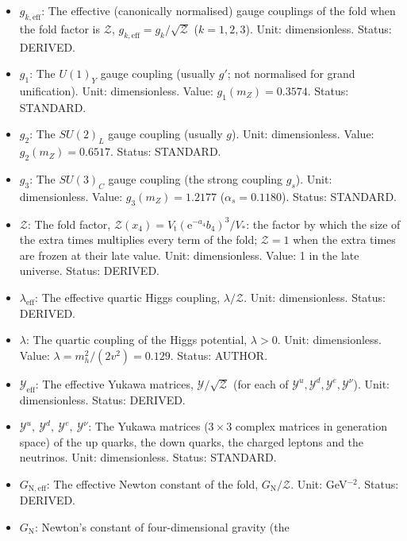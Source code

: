 \documentclass[
  10pt,
]{article}
\providecommand{\tightlist}{%
  \setlength{\itemsep}{0pt}\setlength{\parskip}{0pt}}
\begin{document}
\begin{itemize}
\tightlist
\item
  \(g_{k,\mathrm{eff}}\): The effective (canonically normalised) gauge
  couplings of the fold when the fold factor is \(\mathcal{Z}\),
  \(g_{k,\mathrm{eff}} = g_k/\sqrt{\mathcal{Z}}\) (\(k = 1, 2, 3\)).
  Unit: dimensionless. Status: DERIVED.
\item
  \(g_1\): The \(U(1)_Y\) gauge coupling (usually \(g'\); not normalised
  for grand unification). Unit: dimensionless. Value:
  \(g_1(m_Z) = 0.3574\). Status: STANDARD.
\item
  \(g_2\): The \(SU(2)_L\) gauge coupling (usually \(g\)). Unit:
  dimensionless. Value: \(g_2(m_Z) = 0.6517\). Status: STANDARD.
\item
  \(g_3\): The \(SU(3)_C\) gauge coupling (the strong coupling \(g_s\)).
  Unit: dimensionless. Value: \(g_3(m_Z) = 1.2177\)
  (\(\alpha_s = 0.1180\)). Status: STANDARD.
\item
  \(\mathcal{Z}\): The fold factor,
  \(\mathcal{Z}(x_4) = V_{\mathrm{t}}(\mathrm{e}^{-a_4}b_4)^3/V_*\): the
  factor by which the size of the extra times multiplies every term of
  the fold; \(\mathcal{Z} = 1\) when the extra times are frozen at their
  late value. Unit: dimensionless. Value: 1 in the late universe.
  Status: DERIVED.
\item
  \(\lambda_{\mathrm{eff}}\): The effective quartic Higgs coupling,
  \(\lambda/\mathcal{Z}\). Unit: dimensionless. Status: DERIVED.
\item
  \(\lambda\): The quartic coupling of the Higgs potential,
  \(\lambda > 0\). Unit: dimensionless. Value:
  \(\lambda = m_h^2/(2v^2) = 0.129\). Status: AUTHOR.
\item
  \(\mathcal{Y}_{\mathrm{eff}}\): The effective Yukawa matrices,
  \(\mathcal{Y}/\sqrt{\mathcal{Z}}\) (for each of
  \(\mathcal{Y}^{u}, \mathcal{Y}^{d}, \mathcal{Y}^{e}, \mathcal{Y}^{\nu}\)).
  Unit: dimensionless. Status: DERIVED.
\item
  \(\mathcal{Y}^{u},\ \mathcal{Y}^{d},\ \mathcal{Y}^{e},\ \mathcal{Y}^{\nu}\):
  The Yukawa matrices (\(3 \times 3\) complex matrices in generation
  space) of the up quarks, the down quarks, the charged leptons and the
  neutrinos. Unit: dimensionless. Status: STANDARD.
\item
  \(G_{\mathrm{N,eff}}\): The effective Newton constant of the fold,
  \(G_{\mathrm{N}}/\mathcal{Z}\). Unit: GeV\(^{-2}\). Status: DERIVED.
\item
  \(G_{\mathrm{N}}\): Newton's constant of four-dimensional gravity (the

\end{itemize}
\end{document}
